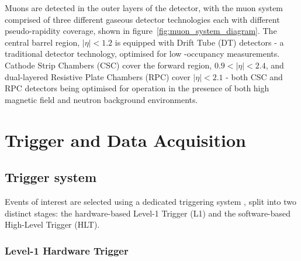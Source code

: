 Muons are detected in the outer layers of the detector, with the muon system 
comprised of three different gaseous detector technologies each with different 
pseudo-rapidity coverage, shown in figure~\ref{fig:muon_system_diagram}. The
central barrel region, $|\eta|<1.2$ is equipped with 
Drift Tube (DT) detectors - a traditional detector technology, optimised for low
-occupancy measurements. Cathode Strip Chambers (CSC) cover the forward region,
$0.9 < |\eta| < 2.4$, and dual-layered Resistive Plate Chambers (RPC) cover
$|\eta| < 2.1$ - both CSC and RPC detectors being optimised for operation in 
the presence of both high magnetic field and neutron background environments.

\section{Trigger and Data Acquisition}  %
\label{sec:detector_trigger}

\subsection{Trigger system}
Events of interest are selected using a dedicated triggering system \cite{tridasTDR},
split into two distinct stages: the hardware-based Level-1 Trigger (L1) and
the software-based High-Level Trigger (HLT).

\subsubsection{Level-1 Hardware Trigger}


